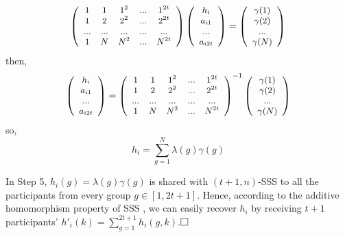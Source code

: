 \[
\small
\left(\begin{array}{ccccc} 
	1 &    1 & 1^2 & ...  & 1^{2t} \\ 
	1 &    2 & 2^2 & ... & 2^{2t}\\
	... & ... & ... & ...& ...\\
	1 & N & N^2 & ... & N^{2t}\\
\end{array}\right) 
\left(\begin{array}{c} 
	h_i    \\ 
	a_{i1}    \\
	... \\
	a_{i2t} \\
\end{array}\right) 
=
\left(\begin{array}{c} 
	\gamma(1)    \\ 
	\gamma(2)    \\
	... \\
	\gamma(N) \\
\end{array}\right) 
\]
then,
\[
\small
\left(\begin{array}{c} 
	h_i    \\ 
	a_{i1}    \\
	... \\
	a_{i2t} \\
\end{array}\right) 
=
\left(\begin{array}{ccccc} 
	1 &    1 & 1^2 & ...  & 1^{2t} \\ 
	1 &    2 & 2^2 & ... & 2^{2t}\\
	... & ... & ... & ...& ...\\
	1 & N & N^2 & ... & N^{2t}\\
\end{array}\right)^{-1} 
\left(\begin{array}{c} 
	\gamma(1)    \\ 
	\gamma(2)    \\
	... \\
	\gamma(N) \\
\end{array}\right) 
\]
so,
$$h_i=\sum_{g=1}^{N} \lambda(g)\gamma(g)$$

In Step 5, $h_i(g)=\lambda(g)\gamma(g)$ is shared with $(t+1,n)$-SSS to all the participants from every group $g \in [1, 2t+1]$. Hence, according to the additive homomorphism property of SSS \cite{shamir1979share}, we can easily recover $h_i$ by receiving $t+1$ participants'  $h'_i(k) = \sum_{g=1}^{2t+1} h_i(g, k)$.$\qed$

